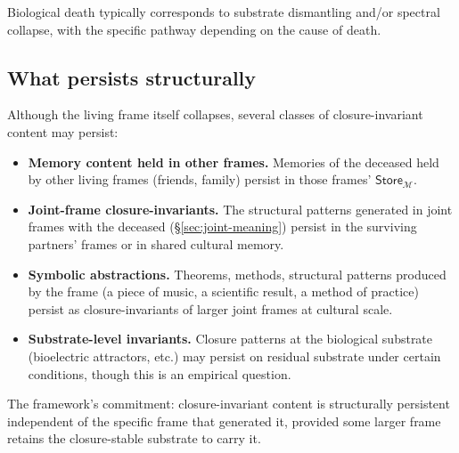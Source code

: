 \documentclass[11pt]{article}
\theoremstyle{plain}
\theoremstyle{definition}
\theoremstyle{remark}
\newcommand{\Mcal}{\mathcal{M}}
\begin{document}
Biological death typically corresponds to substrate dismantling and/or spectral collapse, with the specific pathway depending on the cause of death.

\subsection{What persists structurally}

Although the living frame itself collapses, several classes of closure-invariant content may persist:

\begin{itemize}[leftmargin=2em]
\item \textbf{Memory content held in other frames.} Memories of the deceased held by other living frames (friends, family) persist in those frames' $\mathsf{Store}_\Mcal$.
\item \textbf{Joint-frame closure-invariants.} The structural patterns generated in joint frames with the deceased (\S\ref{sec:joint-meaning}) persist in the surviving partners' frames or in shared cultural memory.
\item \textbf{Symbolic abstractions.} Theorems, methods, structural patterns produced by the frame (a piece of music, a scientific result, a method of practice) persist as closure-invariants of larger joint frames at cultural scale.
\item \textbf{Substrate-level invariants.} Closure patterns at the biological substrate (bioelectric attractors, etc.) may persist on residual substrate under certain conditions, though this is an empirical question.
\end{itemize}

The framework's commitment: closure-invariant content is structurally persistent independent of the specific frame that generated it, provided some larger frame retains the closure-stable substrate to carry it.
\end{document}
